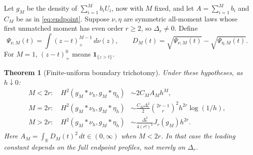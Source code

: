 \documentclass[11pt,a4paper]{article}
\numberwithin{equation}{section}
\newtheorem{theorem}{Theorem}[section]
\theoremstyle{definition}
\theoremstyle{remark}
\newcommand{\R}{\mathbb R}
\newcommand{\ind}{\mathbf 1}
\begin{document}
Let $g_M$ be the density of $\sum_{i=1}^M b_iU_i$, now with $M$ fixed, and
let $A=\sum_{i=1}^M b_i$ and $C_M$ be as in \eqref{eq:endpoint}. Suppose
$\nu,\eta$ are symmetric all-moment laws whose first unmatched moment has
even order $r\ge2$, so $\Delta_r\ne0$. Define
\begin{equation}
 \Psi_{\nu,M}(t)=\int (z-t)_+^{M-1}\,d\nu(z),\qquad
 D_M(t)=\sqrt{\Psi_{\nu,M}(t)}-\sqrt{\Psi_{\eta,M}(t)}.
 \label{eq:profiles}
\end{equation}
For $M=1$, $(z-t)_+^0$ means $\ind_{\{z>t\}}$.

\begin{theorem}[Finite-uniform boundary trichotomy]
\label{thm:phase}
Under these hypotheses, as $h\downarrow0$:
\begin{align}
 M<2r:\quad
 H^2(g_M*\nu_h,g_M*\eta_h)
 &\sim 2C_M A_M h^M,
 \label{eq:phase-sub}\\
 M=2r:\quad
 H^2(g_M*\nu_h,g_M*\eta_h)
 &\sim \frac{C_M\Delta_r^2}{2}
 \binom{2r-1}{r}^{\!2}h^{2r}\log(1/h),
 \label{eq:phase-critical}\\
 M>2r:\quad
 H^2(g_M*\nu_h,g_M*\eta_h)
 &\sim\frac{\Delta_r^2}{4(r!)^2}J_r(g_M)h^{2r}.
 \label{eq:phase-regular}
\end{align}
Here $A_M=\int_\R D_M(t)^2\,dt\in(0,\infty)$ when $M<2r$.
In that case the leading constant depends on the full endpoint
profiles, not merely on $\Delta_r$.
\end{theorem}
\end{document}
